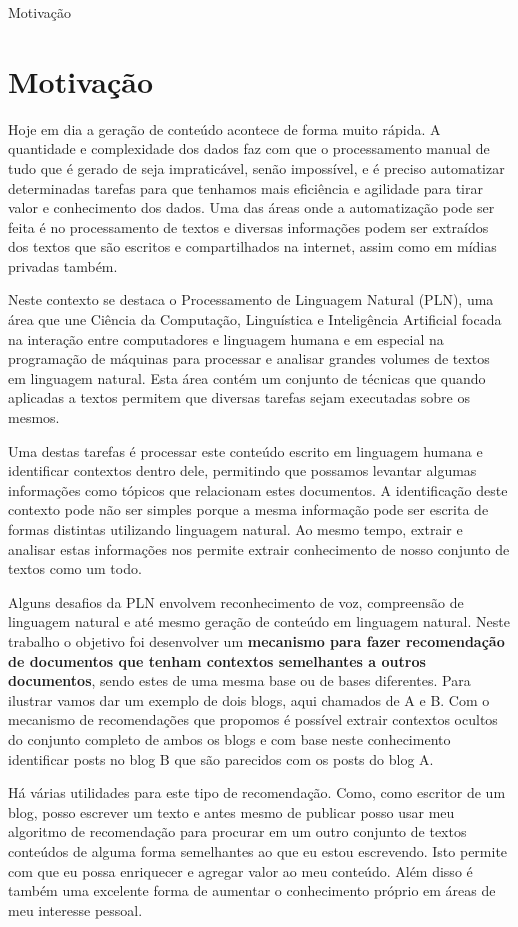 Motivação

\section{Motivação}

Hoje em dia a geração de conteúdo acontece de forma muito rápida. A quantidade e complexidade dos dados faz com que o processamento manual de tudo que é gerado de seja impraticável, senão impossível, e é preciso automatizar determinadas tarefas para que tenhamos mais eficiência e agilidade para tirar valor e conhecimento dos dados. Uma das áreas onde a automatização pode ser feita é no processamento de textos e diversas informações podem ser extraídos dos textos que são escritos e compartilhados na internet, assim como em mídias privadas também.

Neste contexto se destaca o Processamento de Linguagem Natural (PLN), uma área que une Ciência da Computação, Linguística e Inteligência Artificial focada na interação entre computadores e linguagem humana e em especial na programação de máquinas para processar e analisar grandes volumes de textos em linguagem natural. Esta área contém um conjunto de técnicas que quando aplicadas a textos permitem que diversas tarefas sejam executadas sobre os mesmos. 

Uma destas tarefas é processar este conteúdo escrito em linguagem humana e identificar contextos dentro dele, permitindo que possamos levantar algumas informações como tópicos que relacionam estes documentos. A identificação deste contexto pode não ser simples porque a mesma informação pode ser escrita de formas distintas utilizando linguagem natural. Ao mesmo tempo, extrair e analisar estas informações nos permite extrair conhecimento de nosso conjunto de textos como um todo.

Alguns desafios da PLN envolvem reconhecimento de voz, compreensão de linguagem natural e até mesmo geração de conteúdo em linguagem natural. Neste trabalho o objetivo foi desenvolver um \textbf{mecanismo para fazer recomendação de documentos que tenham contextos semelhantes a outros documentos}, sendo estes de uma mesma base ou de bases diferentes. Para ilustrar vamos dar um exemplo de dois blogs, aqui chamados de A e B. Com o mecanismo de recomendações que propomos é possível extrair contextos ocultos do conjunto completo de ambos os blogs e com base neste conhecimento identificar posts no blog B que são parecidos com os posts do blog A.

Há várias utilidades para este tipo de recomendação. Como, como escritor de um blog, posso escrever um texto e antes mesmo de publicar posso usar meu algoritmo de recomendação para procurar em um outro conjunto de textos conteúdos de alguma forma semelhantes ao que eu estou escrevendo. Isto permite com que eu possa enriquecer e agregar valor ao meu conteúdo. Além disso é também uma excelente forma de aumentar o conhecimento próprio em áreas de meu interesse pessoal.

